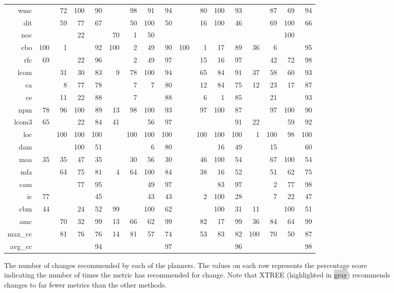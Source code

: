 \begin{figure*}[t!]
\begin{center}
{\begin{tabular}{r|rrrr|rrrr|rrrr|rrrr}
wmc && 72 & 100 & 90 && 98 & 91 & 94 && 80 & 100 & 93 && 87 & 69 & 94    \bigstrut[t]\\
dit && 59 & 77 & 67 && 50 & 100 & 50 && 16 & 100 & 46 && 69 & 100 & 66    \\
noc &&& 22 && \cellcolor{lightgray}70 & 1 & 50 &&&&&&&& 100 &    \\
cbo & \cellcolor{lightgray}100 & 1 && 92 & \cellcolor{lightgray}100 & 2 & 49 & 90 & \cellcolor{lightgray}100 & 1 & 17 & 89 & \cellcolor{lightgray}36 & 6 && 95    \\
rfc & \cellcolor{lightgray}69 && 22 & 96 && 2 & 49 & 97 && 15 & 16 & 97 && 42 & 72 & 98    \\
lcom && 31 & 30 & 83 & 9 & 78 & 100 & 94 && 65 & 84 & 91 & \cellcolor{lightgray}37 & 58 & 60 & 93    \\
ca && 8 & 77 & 78 && 7 & 7 & 80 && 12 & 84 & 75 & \cellcolor{lightgray}12 & 23 & 17 & 87    \\
ce && 11 & 22 & 88 && 7 && 88 && 6 & 1 & 85 && 21 && 93    \\
npm & \cellcolor{lightgray}78 & 96 & 100 & 89 & \cellcolor{lightgray}13 & 98 & 100 & 93 && 97 & 100 & 87 && 97 & 100 & 90    \\
lcom3 & \cellcolor{lightgray}65 && 22 & 84 & \cellcolor{lightgray}41 && 56 & 97 &&&& 91 & \cellcolor{lightgray}22 && 59 & 92    \\
loc && 100 & 100 & 100 && 100 & 100 & 100 && 100 & 100 & 100 & \cellcolor{lightgray}1 & 100 & 98 & 100   \\
dam &&& 100 & 51 &&& 6 & 80 &&& 16 & 49 && 15 && 60    \\
moa & \cellcolor{lightgray}35 & 35 & 47 & 35 && 30 & 56 & 30 && 46 & 100 & 54 && 67 & 100 & 54    \\
mfa && 64 & 75 & 81 & 4 & 64 & 100 & 84 && 38 & 16 & 52 && 51 & 62 & 75    \\
cam &&& 77 & 95 &&& 49 & 97 &&& 83 & 97 && 2 & 77 & 98    \\
ic & \cellcolor{lightgray}77 &&& 45 &&& 43 & 43 && 2 & 100 & 28 && 7 & 22 & 47    \\
cbm & \cellcolor{lightgray}44 && 24 & 52 & \cellcolor{lightgray}99 && 100 & 62 &&& 100 & 31 & \cellcolor{lightgray}11 && 100 & 51    \\
amc && 70 & 32 & 99 & \cellcolor{lightgray}13 & 66 & 62 & 99 && 82 & 17 & 99 & \cellcolor{lightgray}36 & 84 & 64 & 99    \\
max\_cc && 81 & 76 & 76 & \cellcolor{lightgray}14 & 81 & 57 & 74 && 53 & 83 & 82 & \cellcolor{lightgray}100 & 70 & 50 & 87    \\
avg\_cc &&&& 94 &&&& 97 &&&& 96 &&&& 98
\end{tabular}}
\end{center}
 
\caption{The number of changes recommended by each of the planners. The values on each row represents the percentage score indicating the number of times the metric has recommended for change. Note that   XTREE  (highlighted in \colorbox{lightgray}{gray}) recommends changes to far fewer metrics than the other   methods.}
\label{fig:deltas}
\end{figure*}
